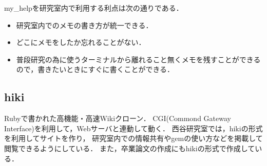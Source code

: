 my\_helpを研究室内で利用する利点は次の通りである．
\begin{itemize}
\item 研究室内でのメモの書き方が統一できる．
\item どこにメモをしたか忘れることがない．
\item 普段研究の為に使うターミナルから離れること無くメモを残すことができるので，書きたいときにすぐに書くことができる．
\end{itemize}

\subsection{hiki}
Rubyで書かれた高機能・高速Wikiクローン\cite{d}．
CGI(Commond Gateway Interface)を利用して，Webサーバと連動して動く\cite{e}．
西谷研究室では，hikiの形式を利用してサイトを作り，
研究室内での情報共有やgemの使い方などを掲載して閲覧できるようにしている．
また，卒業論文の作成にもhikiの形式で作成している．

